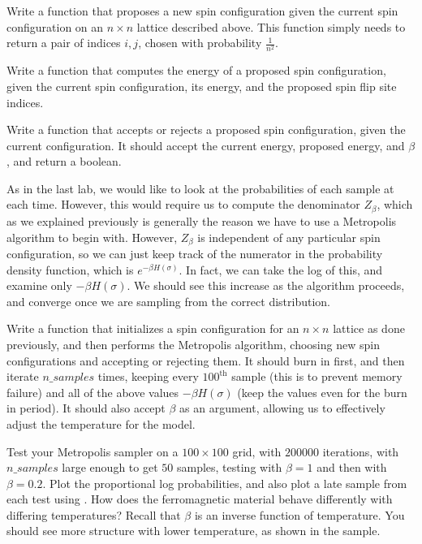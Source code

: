 \begin{problem}
Write a function that proposes a new spin configuration given the current spin configuration on an $n \times n$ lattice described above. This function simply needs to return a pair of indices $i,j$, chosen with probability $\frac{1}{n^{2}}$.
\end{problem}

\begin{problem}
Write a function that computes the energy of a proposed spin configuration, given the current spin configuration, its energy, and the proposed spin flip site indices.
\end{problem}

\begin{problem}
Write a function that accepts or rejects a proposed spin configuration, given the current configuration. It should accept the current energy, proposed energy, and $\beta$, and return a boolean.
\end{problem}

As in the last lab, we would like to look at the probabilities of each sample at each time. However, this would require us to compute the denominator $Z_{\beta}$, which as we explained previously is generally the reason we have to use a Metropolis algorithm to begin with. However, $Z_{\beta}$ is independent of any particular spin configuration, so we can just keep track of the numerator in the probability density function, which is $e^{-\beta H(\sigma)}$. In fact, we can take the log of this, and examine only $-\beta H(\sigma)$. We should see this increase as the algorithm proceeds, and converge once we are sampling from the correct distribution.

\begin{problem}
Write a function that initializes a spin configuration for an $n \times n$ lattice as done previously, and then performs the Metropolis algorithm, choosing new spin configurations and accepting or rejecting them. It should burn in first, and then iterate $n\_samples$ times, keeping every $100^{\text{th}}$ sample (this is to prevent memory failure) and all of the above values $-\beta H(\sigma)$ (keep the values even for the burn in period). It should also accept $\beta$ as an argument, allowing us to effectively adjust the temperature for the model.
\end{problem}

\begin{problem}
Test your Metropolis sampler on a $100 \times 100$ grid, with $200000$ iterations, with $n\_samples$ large enough to get $50$ samples, testing with $\beta = 1$ and then with $\beta = 0.2$. Plot the proportional log probabilities, and also plot a late sample from each test using . How does the ferromagnetic material behave differently with differing temperatures? Recall that $\beta$ is an inverse function of temperature. You should see more structure with lower temperature, as shown in the sample.
\end{problem}

